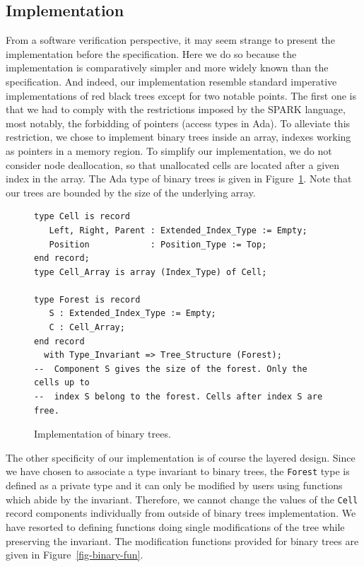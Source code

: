 \documentclass{llncs}
\newcommand{\spark}{SPARK\xspace}
\begin{document}
\subsection{Implementation}

From a software verification perspective, it may seem strange to present the implementation
before the specification. Here we do so because the implementation is comparatively
simpler and more widely known than the specification. And indeed, our implementation
resemble standard imperative implementations of red black trees except for two notable
points. The first one is that we had to comply with the restrictions imposed by the
\spark language, most notably, the forbidding of pointers (access types in Ada). To
alleviate this restriction, we chose to implement binary trees inside an array, indexes
working as pointers in a memory region. To simplify our implementation, we do not consider
node deallocation, so that unallocated cells are located after a given index in the array.
The Ada type of binary trees is given in Figure~\ref{fig-binary-typ}.
Note that our trees are bounded by the size of the underlying array.

\begin{figure}[ht]
\begin{small}
\begin{lstlisting}
type Cell is record
   Left, Right, Parent : Extended_Index_Type := Empty;
   Position            : Position_Type := Top;
end record;
type Cell_Array is array (Index_Type) of Cell;

type Forest is record
   S : Extended_Index_Type := Empty;
   C : Cell_Array;
end record
  with Type_Invariant => Tree_Structure (Forest);
--  Component S gives the size of the forest. Only the cells up to
--  index S belong to the forest. Cells after index S are free.
\end{lstlisting}
\end{small}
\caption{\label{fig-binary-typ} Implementation of binary trees.}
\end{figure}

The other specificity of our implementation is of course the layered design. Since we
have chosen to associate a type invariant to binary trees, the \texttt{Forest} type is defined as
a private type and it can only be modified by users using functions which abide by the
invariant. Therefore, we cannot change the values of the \texttt{Cell} record components individually
from outside of binary trees implementation. We have resorted to defining functions
doing single modifications of the tree while preserving the invariant. The modification
functions provided for binary trees are given in Figure~\ref{fig-binary-fun}.
\end{document}
